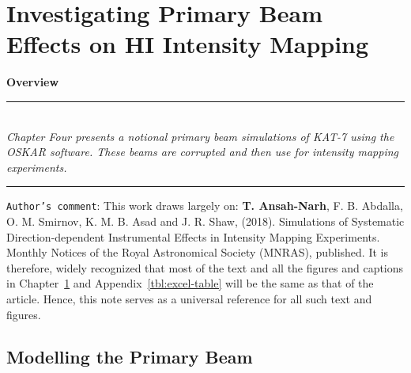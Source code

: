 
\chapter{Investigating Primary Beam Effects on HI Intensity Mapping}
\label{Chapter4} %
\textbf{Overview}\\
\par\noindent\rule{\textwidth}{0.4pt}\\
\textit{Chapter Four  presents a notional primary beam simulations of KAT-7 using the OSKAR software. These beams are corrupted and then use for
intensity mapping experiments.  
}
\par\noindent\rule{\textwidth}{0.4pt}

\noindent \texttt{Author’s comment}:
\small{This work draws largely on: \textbf{T. Ansah-Narh},
F. B. Abdalla, O. M. Smirnov, K. M. B. Asad and J. R. Shaw, (2018). Simulations of Systematic Direction-dependent Instrumental Effects in Intensity Mapping Experiments. Monthly Notices of the Royal Astronomical Society (MNRAS), published. It is therefore, widely recognized that most of the text and all the figures and captions 
in Chapter~\ref{Chapter4} and Appendix~\ref{tbl:excel-table} will be the same as that of the article. 
Hence, this note serves as a universal reference for all such text and figures.
}

\section{Modelling the Primary Beam }	 \label{chap4:beam-model}
%

